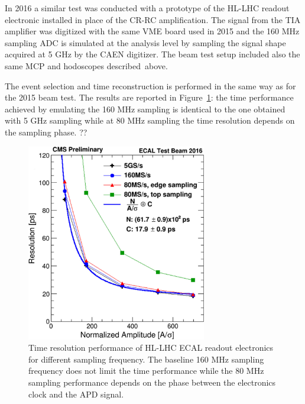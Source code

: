 In 2016 a similar test was conducted with a prototype of the HL-LHC readout electronic installed in place of the
CR-RC amplification. The signal from the TIA amplifier was digitized with the same VME board used in 2015 and the
160 MHz sampling ADC is simulated at the analysis level by sampling the signal shape acquired at 5 GHz by the CAEN digitizer.
The beam test setup included also the same MCP and hodoscopes described~above. 

The event selection and time reconstruction is performed in the same way as for the 2015 beam test.
The results are reported in Figure~\ref{fig:tia_tres}: the time performance achieved by emulating the
160 MHz sampling is identical to the one obtained with 5 GHz sampling while at 80 MHz sampling the time resolution
depends on the sampling phase. ??

\begin{figure}[h!]
  \centering
  \includegraphics[width = 0.7\textwidth]{figures/upgrade/sampling_freq_res_comp.png}
  \caption{Time resolution performance of HL-LHC ECAL readout electronics for different sampling frequency.
    The baseline 160 MHz sampling frequency does not limit the time performance while the 80 MHz sampling
    performance depends on the phase between the electronics clock and the APD signal.}
  \label{fig:tia_tres}
\end{figure}
